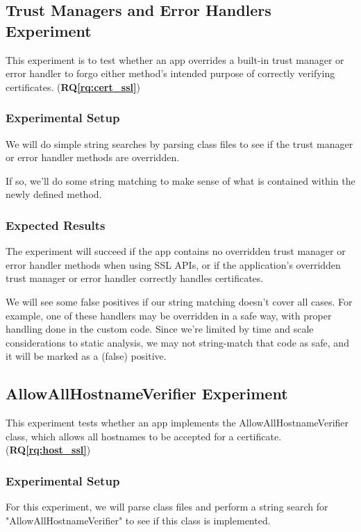 \documentclass[10pt,twocolumn,pdftex]{article}
\newcommand{\rqref}[1]{\textbf{RQ\ref{#1}}}
\begin{document}
\subsection{Trust Managers and Error Handlers Experiment}
This experiment is to test whether an app overrides a built-in trust manager or error handler to forgo either method's intended purpose of correctly verifying certificates. (\rqref{rq:cert_ssl})

    \subsubsection{Experimental Setup}
    We will do simple string searches by parsing class files to see if the trust manager or error handler methods are overridden.

    If so, we'll do some string matching to make sense of what is contained within the newly defined method. 

    \subsubsection{Expected Results}
    The experiment will succeed if the app contains no overridden trust manager or error handler methods when using SSL APIs, or if the application's overridden trust manager or error handler correctly handles certificates.

    We will see some false positives if our string matching doesn't cover all cases. For example, one of these handlers may be overridden in a safe way, with proper handling done in the custom code. Since we're limited by time and scale considerations to static analysis, we may not string-match that code as safe, and it will be marked as a (false) positive.


\subsection{AllowAllHostnameVerifier Experiment}
This experiment tests whether an app implements the AllowAllHostnameVerifier class, which allows all hostnames to be accepted for a certificate. (\rqref{rq:host_ssl})
    
    \subsubsection{Experimental Setup}
    For this experiment, we will parse class files and perform a string search for "AllowAllHostnameVerifier" to see if this class is implemented.
    
\end{document}
